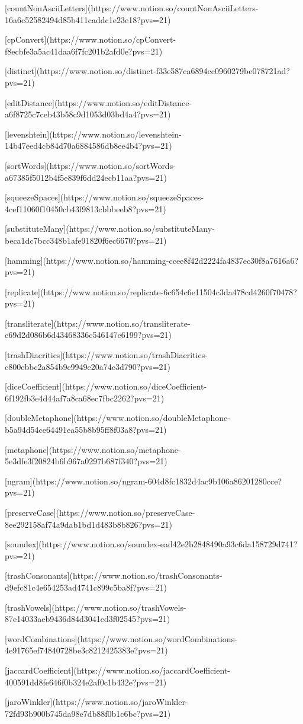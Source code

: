 [countNonAsciiLetters](https://www.notion.so/countNonAsciiLetters-16a6c52582494d85b411caddc1e23e18?pvs=21)

[cpConvert](https://www.notion.so/cpConvert-f8ecbfe3a5ac41daa6f7fc201b2afd0e?pvs=21)

[distinct](https://www.notion.so/distinct-f33e587ca6894cc0960279be078721ad?pvs=21)

[editDistance](https://www.notion.so/editDistance-a6f8725c7ceb43b58c9d1053d03bd4a4?pvs=21)

[levenshtein](https://www.notion.so/levenshtein-14b47eed4cb84d70a6884586db8ee4b4?pvs=21)

[sortWords](https://www.notion.so/sortWords-a67385f5012b4f5e839f6dd24ecb11aa?pvs=21)

[squeezeSpaces](https://www.notion.so/squeezeSpaces-4cef11060f10450cb43f9813cbbbeeb8?pvs=21)

[substituteMany](https://www.notion.so/substituteMany-beca1dc7bcc348b1afe91820f6ec6670?pvs=21)

[hamming](https://www.notion.so/hamming-ccee8f42d2224fa4837ec30f8a7616a6?pvs=21)

[replicate](https://www.notion.so/replicate-6c654c6e11504c3da478cd4260f70478?pvs=21)

[transliterate](https://www.notion.so/transliterate-e69d2d086b6d43468336c546147e6199?pvs=21)

[trashDiacritics](https://www.notion.so/trashDiacritics-c800ebbc2a854b9c9949e20a74c3d790?pvs=21)

[diceCoefficient](https://www.notion.so/diceCoefficient-6f192fb3e4d44af7a8ca68ec7fbc2262?pvs=21)

[doubleMetaphone](https://www.notion.so/doubleMetaphone-b5a94d54ce64491ea55b8b95ff8f03a8?pvs=21)

[metaphone](https://www.notion.so/metaphone-5e3dfe3f20824b6b967a0297b687f340?pvs=21)

[ngram](https://www.notion.so/ngram-604d8fc1832d4ac9b106a86201280cce?pvs=21)

[preserveCase](https://www.notion.so/preserveCase-8ee292158af74a9dab1bd1d483b8b826?pvs=21)

[soundex](https://www.notion.so/soundex-ead42e2b2848490a93c6da158729d741?pvs=21)

[trashConsonants](https://www.notion.so/trashConsonants-d9efc81c4e654253ad4741c899c5ba8f?pvs=21)

[trashVowels](https://www.notion.so/trashVowels-87e14033aeb9436d84d3041ed3f02545?pvs=21)

[wordCombinations](https://www.notion.so/wordCombinations-4e91765ef74840728be3c8212425383e?pvs=21)

[jaccardCoefficient](https://www.notion.so/jaccardCoefficient-400591dd8fe646f0b324e2af0c1b432e?pvs=21)

[jaroWinkler](https://www.notion.so/jaroWinkler-72fd93b900b745da98e7db88f0b1c6bc?pvs=21)